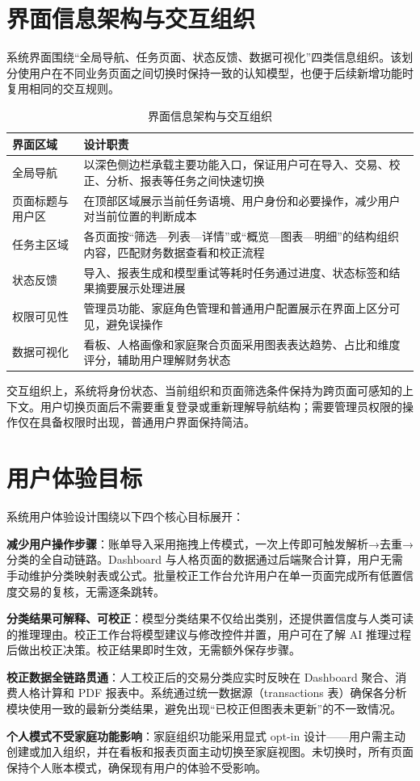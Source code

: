 \section{界面信息架构与交互组织}

系统界面围绕“全局导航、任务页面、状态反馈、数据可视化”四类信息组织。该划分使用户在不同业务页面之间切换时保持一致的认知模型，也便于后续新增功能时复用相同的交互规则。

\begin{table}[H]
\centering
\caption{界面信息架构与交互组织}
\label{tab:frontend-components}
\begin{tabular}{p{4.5cm} p{9cm}}
\toprule
\textbf{界面区域} & \textbf{设计职责} \\
\midrule
全局导航 & 以深色侧边栏承载主要功能入口，保证用户可在导入、交易、校正、分析、报表等任务之间快速切换 \\
\hline
页面标题与用户区 & 在顶部区域展示当前任务语境、用户身份和必要操作，减少用户对当前位置的判断成本 \\
\hline
任务主区域 & 各页面按“筛选—列表—详情”或“概览—图表—明细”的结构组织内容，匹配财务数据查看和校正流程 \\
\hline
状态反馈 & 导入、报表生成和模型重试等耗时任务通过进度、状态标签和结果摘要展示处理进展 \\
\hline
权限可见性 & 管理员功能、家庭角色管理和普通用户配置展示在界面上区分可见，避免误操作 \\
\hline
数据可视化 & 看板、人格画像和家庭聚合页面采用图表表达趋势、占比和维度评分，辅助用户理解财务状态 \\
\bottomrule
\end{tabular}
\end{table}

交互组织上，系统将身份状态、当前组织和页面筛选条件保持为跨页面可感知的上下文。用户切换页面后不需要重复登录或重新理解导航结构；需要管理员权限的操作仅在具备权限时出现，普通用户界面保持简洁。

\section{用户体验目标}

系统用户体验设计围绕以下四个核心目标展开：

\textbf{减少用户操作步骤}：账单导入采用拖拽上传模式，一次上传即可触发解析→去重→分类的全自动链路。Dashboard 与人格页面的数据通过后端聚合计算，用户无需手动维护分类映射表或公式。批量校正工作台允许用户在单一页面完成所有低置信度交易的复核，无需逐条跳转。

\textbf{分类结果可解释、可校正}：模型分类结果不仅给出类别，还提供置信度与人类可读的推理理由。校正工作台将模型建议与修改控件并置，用户可在了解 AI 推理过程后做出校正决策。校正结果即时生效，无需额外保存步骤。

\textbf{校正数据全链路贯通}：人工校正后的交易分类应实时反映在 Dashboard 聚合、消费人格计算和 PDF 报表中。系统通过统一数据源（transactions 表）确保各分析模块使用一致的最新分类结果，避免出现“已校正但图表未更新”的不一致情况。

\textbf{个人模式不受家庭功能影响}：家庭组织功能采用显式 opt-in 设计——用户需主动创建或加入组织，并在看板和报表页面主动切换至家庭视图。未切换时，所有页面保持个人账本模式，确保现有用户的体验不受影响。
